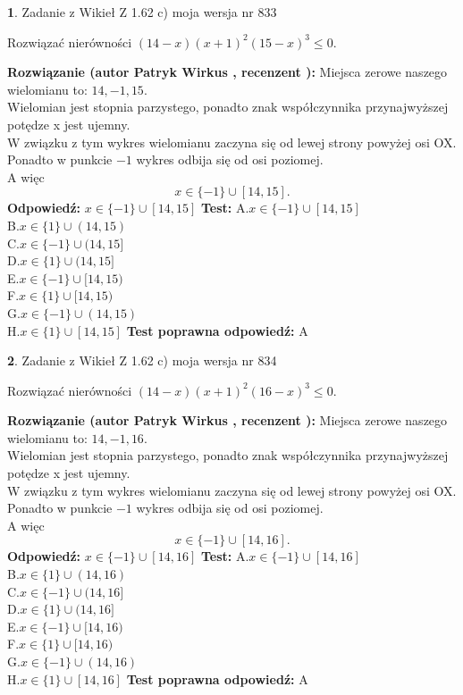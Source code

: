 \documentclass[12pt, a4paper]{article}
\theoremstyle{definition} %
\newtheorem{zad}{}
\newcommand{\zadStart}[1]{\begin{zad}#1\newline}
\newcommand{\zadStop}{\end{zad}}
\newcommand{\rozwStart}[2]{\noindent \textbf{Rozwiązanie (autor #1 , recenzent #2): }\newline}
\newcommand{\rozwStop}{\newline}
\newcommand{\odpStart}{\noindent \textbf{Odpowiedź:}\newline}
\newcommand{\odpStop}{\newline}
\newcommand{\testStart}{\noindent \textbf{Test:}\newline}
\newcommand{\testStop}{\newline}
\newcommand{\kluczStart}{\noindent \textbf{Test poprawna odpowiedź:}\newline}
\newcommand{\kluczStop}{\newline}
\begin{document}
\zadStart{Zadanie z Wikieł Z 1.62 c) moja wersja nr 833}

Rozwiązać nierówności $(14-x)(x+1)^{2}(15-x)^{3}\le0$.
\zadStop
\rozwStart{Patryk Wirkus}{}
Miejsca zerowe naszego wielomianu to: $14, -1, 15$.\\
Wielomian jest stopnia parzystego, ponadto znak współczynnika przy\linebreak najwyższej potędze x jest ujemny.\\ W związku z tym wykres wielomianu zaczyna się od lewej strony powyżej osi OX.\\
Ponadto w punkcie $-1$ wykres odbija się od osi poziomej.\\
A więc $$x \in \{-1\} \cup [14,15].$$
\rozwStop
\odpStart
$x \in \{-1\} \cup [14,15]$
\odpStop
\testStart
A.$x \in \{-1\} \cup [14,15]$\\
B.$x \in \{1\} \cup (14,15)$\\
C.$x \in \{-1\} \cup (14,15]$\\
D.$x \in \{1\} \cup (14,15]$\\
E.$x \in \{-1\} \cup [14,15)$\\
F.$x \in \{1\} \cup [14,15)$\\
G.$x \in \{-1\} \cup (14,15)$\\
H.$x \in \{1\} \cup [14,15]$
\testStop
\kluczStart
A
\kluczStop



\zadStart{Zadanie z Wikieł Z 1.62 c) moja wersja nr 834}

Rozwiązać nierówności $(14-x)(x+1)^{2}(16-x)^{3}\le0$.
\zadStop
\rozwStart{Patryk Wirkus}{}
Miejsca zerowe naszego wielomianu to: $14, -1, 16$.\\
Wielomian jest stopnia parzystego, ponadto znak współczynnika przy\linebreak najwyższej potędze x jest ujemny.\\ W związku z tym wykres wielomianu zaczyna się od lewej strony powyżej osi OX.\\
Ponadto w punkcie $-1$ wykres odbija się od osi poziomej.\\
A więc $$x \in \{-1\} \cup [14,16].$$
\rozwStop
\odpStart
$x \in \{-1\} \cup [14,16]$
\odpStop
\testStart
A.$x \in \{-1\} \cup [14,16]$\\
B.$x \in \{1\} \cup (14,16)$\\
C.$x \in \{-1\} \cup (14,16]$\\
D.$x \in \{1\} \cup (14,16]$\\
E.$x \in \{-1\} \cup [14,16)$\\
F.$x \in \{1\} \cup [14,16)$\\
G.$x \in \{-1\} \cup (14,16)$\\
H.$x \in \{1\} \cup [14,16]$
\testStop
\kluczStart
A
\kluczStop
\end{document}
